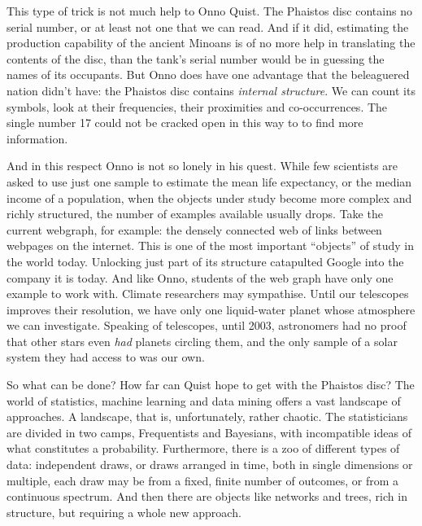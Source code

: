 This type of trick is not much help to Onno Quist. The Phaistos disc contains no serial number, or at least not one that we can read. And if it did, estimating the production capability of the ancient Minoans is of no more help in {translating} the contents of the disc, than the tank's serial number would be in guessing the names of its occupants. But Onno does have one advantage that the beleaguered nation didn't have: the Phaistos disc contains \emph{internal structure}. We can count its symbols, look at their frequencies, their proximities and co-occurrences. The single number 17 could not be cracked open in this way to to find more information.

And in this respect Onno is not so lonely in his quest. While few scientists are asked to use just one sample to estimate the mean life expectancy, or the median income of a population, when the objects under study become more complex and richly structured, the number of examples available usually drops. Take the current webgraph, for example: the densely connected web of links between webpages on the internet. This is one of the most important ``objects'' of study in the world today. Unlocking just part of its structure catapulted Google into the company it is today. And like Onno, students of the web graph have only one example to work with. Climate researchers may sympathise. Until our telescopes improves their resolution, we have only one liquid-water planet whose atmosphere we can investigate. Speaking of telescopes, until 2003, astronomers had no proof that other stars even \emph{had} planets circling them, and the only sample of a solar system they had access to was our own. 

  

So what can be done? How far can Quist hope to get with the Phaistos disc? The world of statistics, machine learning and data mining offers a vast landscape of approaches. A landscape, that is, unfortunately, rather chaotic. The statisticians are divided in two camps, Frequentists and Bayesians, with incompatible ideas of what constitutes a probability. Furthermore, there is a zoo of different types of data: 
independent draws, or draws arranged in time, both in single dimensions or multiple, each draw may be from a fixed, finite number of outcomes, or from a continuous spectrum. And then there are objects like networks and trees, rich in structure, but requiring a whole new approach.

